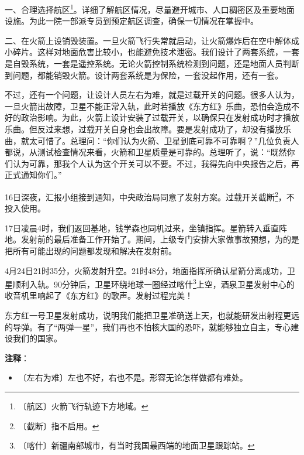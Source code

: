 \documentclass[12pt,UTF-8,openany]{ctexbook}
\begin{document}
\begin{large}
    一、合理选择航区\footnote{〔航区〕火箭飞行轨迹下方地域。}。详细了解航区情况，尽量避开城市、人口稠密区及重要地面设施。为此一院一部派专员到预定航区调查，确保一切情况在掌握中。
    
    二、在火箭上设销毁装置。一旦火箭飞行失常就启动，让火箭爆炸后在空中解体成小碎片。这样对地面危害比较小，也能避免技术泄密。我们设计了两套系统，一套是自毁系统，一套是遥控系统。无论火箭控制系统检测到问题，还是地面人员判断到问题，都能销毁火箭。设计两套系统是为保险，一套没起作用，还有一套。
    
    不过，还有一个问题，让设计人员左右为难，就是过载开关的问题。很多人认为，一旦火箭出故障，卫星不能正常入轨，此时若播放《东方红》乐曲，恐怕会造成不好的政治影响。为此，火箭上设计安装了过载开关，以确保只在发射成功时才播放乐曲。但反过来想，过载开关自身也会出故障。要是发射成功了，却没有播放乐曲，就太可惜了。总理问：“你们认为火箭、卫星到底可靠不可靠啊？”几位负责人都说，从测试检查情况来看，火箭和卫星质量是可靠的。总理听了，说：“既然你们认为可靠，那我个人认为这个开关可以不要。不过，我得先向中央报告之后，再正式通知你们。”
    
    16日深夜，汇报小组接到通知，中央政治局同意了发射方案。过载开关截断\footnote{〔截断〕指不启用。}，不投入使用。
    
    17日凌晨4时，我们返回基地，钱学森也同机过来，坐镇指挥。星箭转入垂直阵地。发射前的最后准备工作开始了。期间，上级专门安排大家做事故预想，为的是把所有可能出现的问题都发现和解决在发射前。
    
    4月24日21时35分，火箭发射升空。21时48分，地面指挥所确认星箭分离成功，卫星顺利入轨。90分钟后，卫星环绕地球一圈经过喀什\footnote{〔喀什〕新疆南部城市，有当时我国最西端的地面卫星跟踪站。}上空，酒泉卫星发射中心的收音机里响起了《东方红》的歌声。发射过程完美！
    
    东方红一号卫星发射成功，说明我们能把卫星准确送上天，也就能研发出射程更远的导弹。有了“两弹一星”，我们再也不怕核大国的恐吓，就能够独立自主，专心建设我们的国家。
    
\end{large}


\newpage

\textbf{注释}：

\vspace{-1em}

\begin{itemize}
    \setlength\itemsep{-0.2em}
    \item 〔左右为难〕左也不好，右也不是。形容无论怎样做都有难处。
\end{itemize}
\end{document}
